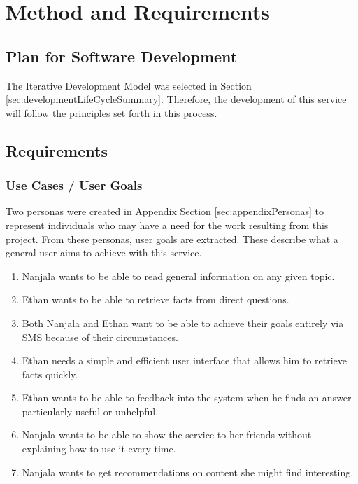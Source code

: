 \documentclass{article}
\begin{document}
\newpage
\section{Method and Requirements}
\label{sec:method}

\subsection{Plan for Software Development}
The Iterative Development Model was selected in Section \ref{sec:developmentLifeCycleSummary}.  Therefore, the development of this service will follow the principles set forth in this process.

\subsection{Requirements}
\subsubsection{Use Cases / User Goals}
Two personas were created in Appendix Section \ref{sec:appendixPersonas} to represent individuals who may have a need for the work resulting from this project.  From these personas, user goals are extracted.  These describe what a general user aims to achieve with this service.
\begin{enumerate}
  \item Nanjala wants to be able to read general information on any given topic.
  \item Ethan wants to be able to retrieve facts from direct questions.
  \item Both Nanjala and Ethan want to be able to achieve their goals entirely via SMS because of their circumstances.
  \item Ethan needs a simple and efficient user interface that allows him to retrieve facts quickly. 
  \item Ethan wants to be able to feedback into the system when he finds an answer particularly useful or unhelpful. 
  \item Nanjala wants to be able to show the service to her friends without explaining how to use it every time.
  \item Nanjala wants to get recommendations on content she might find interesting. 
\end{enumerate}
\end{document}
